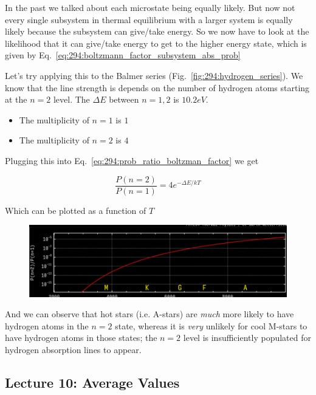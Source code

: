 \documentclass[10pt]{article}
\begin{document}
In the past we talked about each microstate being equally likely. 
But now not every single subsystem in thermal equilibrium with a larger system is equally likely because the subsystem can give/take energy. 
So we now have to look at the likelihood that it can give/take energy to get to the higher energy state, which is given by Eq.~\ref{eq:294:boltzmann_factor_subsystem_abs_prob}


\begin{example}
	Let's try applying this to the Balmer series (Fig.~\ref{fig:294:hydrogen_series}).
	We know that the line strength is depends on the number of hydrogen atoms starting at the $ n=2 $ level. 
	The $ \Delta E $  between $ n=1, 2 $  is $ 10.2 eV $. 
	\begin{itemize}
		\item The multiplicity of $ n=1 $  is $ 1 $ 
		\item The multiplicity of $ n=2 $  is $ 4 $ 
	\end{itemize}

	Plugging this into Eq.~\ref{eq:294:prob_ratio_boltzman_factor} we get

	\begin{equation}
		\frac{P(n=2)}{P(n=1)} = 4e^{-\Delta E /kT}
	\end{equation}

	Which can be plotted as a function of $ T $ 

	\begin{figure}[H]
		\centering
		\includegraphics[width=0.8\linewidth]{img/294_balmer_line_prob_dist_plot.png}
	\end{figure}

	And we can observe that hot stars (i.e. A-stars) are \textit{much}  more likely to have hydrogen atoms in the $ n=2 $ state, whereas it is  \textit{very}  unlikely for cool M-stars to have hydrogen atoms in those states; the $ n=2 $  level is insufficiently populated for hydrogen absorption lines to appear. 


\end{example}


\subsection{Lecture 10: Average Values}
\end{document}

